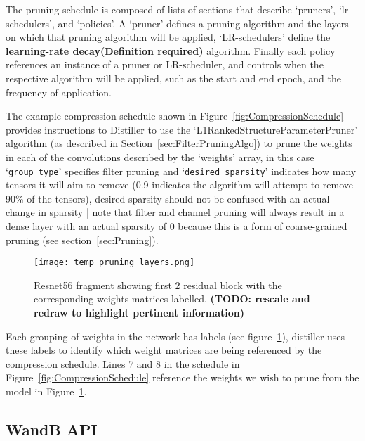 \documentclass[../Dissertation.tex]{subfiles}
\begin{document}
The pruning schedule is composed of lists of sections that describe `{\color{mintedgreen}pruners}', `{\color{mintedgreen}lr-schedulers}', and `{\color{mintedgreen}policies}'. 
A `{\color{mintedgreen}pruner}' defines a pruning algorithm and the layers on which that pruning algorithm will be applied, `LR-schedulers' define the \textbf{learning-rate decay(\color{red}Definition required)} algorithm. 
Finally each policy references an instance of a pruner or LR-scheduler, and controls when the respective algorithm will be applied, such as the start and end epoch, and the frequency of application.

The example compression schedule shown in Figure~\ref{fig:CompressionSchedule} provides instructions to Distiller to use the `L1RankedStructureParameterPruner' algorithm (as described in Section~\ref{sec:FilterPruningAlgo}) to prune the weights in each of the convolutions described by the `weights' array, in this case `\texttt{\color{mintedgreen}group\_type}' specifies filter pruning and `\texttt{\color{mintedgreen}desired\_sparsity}' indicates how many tensors it will aim to remove (0.9 indicates the algorithm will attempt to remove 90\% of the tensors), desired sparsity should not be confused with an actual change in sparsity | note that filter and channel pruning will always result in a dense layer with an actual sparsity of 0 because this is a form of coarse-grained pruning (see section~\ref{sec:Pruning}).

\begin{figure}[H]
    \texttt{[image: temp\_pruning\_layers.png]}
    \caption{Resnet56 fragment showing first 2 residual block with the corresponding weights matrices labelled. \textbf{(TODO: rescale and redraw to highlight pertinent information)}}
    \label{fig:resnet56weightlabels}
\end{figure}

Each grouping of weights in the network has labels (see figure~\ref{fig:resnet56weightlabels}), distiller uses these labels to identify which weight matrices are being referenced by the compression schedule. 
Lines 7 and 8 in the schedule in Figure~\ref{fig:CompressionSchedule} reference the weights we wish to prune from the model in Figure~\ref{fig:resnet56weightlabels}.


\newpage
\subsection{WandB API}
\end{document}
